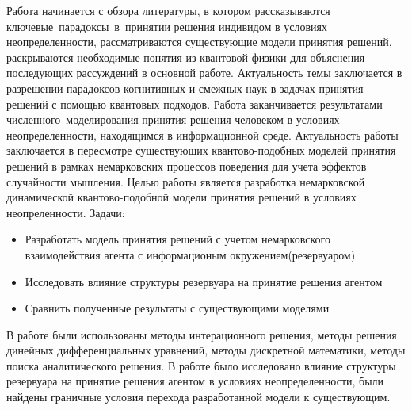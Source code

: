 \intro

Работа начинается с обзора литературы, в котором рассказываются ключевые~парадоксы~в~принятии
решения индивидом в условиях неопределенности, рассматриваются существующие модели принятия решений,
раскрываются необходимые понятия из квантовой физики для объяснения последующих рассуждений в
основной работе.
Актуальность темы заключается в разрешении парадоксов когнитивных и смежных наук в задачах принятия
решений с помощью квантовых подходов.
Работа заканчивается результатами численного~моделирования принятия решения человеком в условиях
неопределенности, находящимся в информационной среде.
Актуальность работы заключается в пересмотре существующих квантово-подобных моделей принятия решений
в рамках немарковских процессов поведения для учета эффектов случайности мышления.
Целью работы является разработка немарковской динамической квантово-подобной модели принятия решений
в условиях неопреленности.
Задачи:
\begin{itemize}
    \item Разработать модель принятия решений с учетом немарковского взаимодействия агента с информационым окружением(резервуаром)
    \item Исследовать влияние структуры резервуара на принятие решения агентом
    \item Сравнить полученные результаты с существующими моделями
\end{itemize}
В работе были использованы методы интерационного решения, методы решения динейных дифференциальных уравнений,
методы дискретной математики, методы поиска аналитического решения.
В работе было исследовано влияние структуры резервуара на принятие решения агентом в условиях неопределенности,
были найдены граничные условия перехода разработанной модели к существующим.
